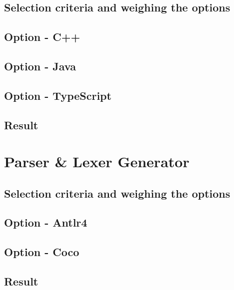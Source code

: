 \subsection{Selection criteria and weighing the options}



\subsection{Option - C++}



\subsection{Option - Java}



\subsection{Option - TypeScript}



\subsection{Result}



\section{Parser \& Lexer Generator}



\subsection{Selection criteria and weighing the options}



\subsection{Option - Antlr4}



\subsection{Option - Coco}



\subsection{Result}


